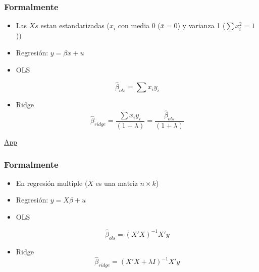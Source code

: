\documentclass[
  shownotes,
  xcolor={svgnames},
  hyperref={colorlinks,citecolor=DarkBlue,linkcolor=andesred,urlcolor=DarkBlue}
  , aspectratio=169]{beamer}
\begin{document}
\begin{frame}[fragile]
\frametitle{Formalmente}



\begin{itemize}
  \item Las $Xs$ estan estandarizadas ($x_i$ con media 0 ($\bar{x}=0$) y varianza 1 ($\sum x^2_i=1$))
  \medskip
  \item Regresión: $y= \beta x + u$ 
  \medskip
  \item OLS 
  
        \begin{equation*}
          \hat{\beta}_{ols}=\sum x_iy_i
        \end{equation*}
        \medskip
  
  \item Ridge 
  \begin{equation*}
          \hat{\beta}_{ridge}=\frac{\sum x_iy_i}{(1+\lambda)}=\frac{\hat{\beta}_{ols}}{(1+\lambda)}
        \end{equation*}

\end{itemize}

\href{https://cede.uniandes.edu.co/OLS/}{App}
\end{frame}
\begin{frame}[fragile]
\frametitle{Formalmente}

\begin{itemize}
    \item En regresión multiple ($X$ es una matriz $n\times k$)
    \medskip
\item Regresión: $y= X \beta   + u$ 
  \medskip
  \item OLS 
  
        \begin{equation*}
          \hat{\beta}_{ols}= (X'X)^{-1}X'y
        \end{equation*}
        \medskip
  
  \item Ridge 
  \begin{equation*}
          \hat{\beta}_{ridge}= (X'X+ \lambda I)^{-1}X'y
        \end{equation*}

\end{itemize}
\end{frame}
\end{document}
